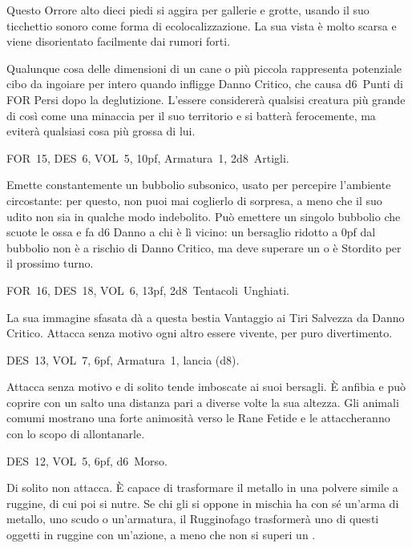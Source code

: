 \documentclass[itdr]{subfiles}
\begin{document}
Questo Orrore alto dieci piedi si aggira per gallerie e grotte, usando il suo ticchettio sonoro come forma di ecolocalizzazione. La sua vista è molto scarsa e viene disorientato facilmente dai rumori forti.

Qualunque cosa delle dimensioni di un cane o più piccola rappresenta potenziale cibo da ingoiare per intero quando infligge Danno Critico, che causa d6~Punti di FOR Persi dopo la deglutizione. L'essere considererà qualsisi creatura più grande di così come una minaccia per il suo territorio e si batterà ferocemente, ma eviterà qualsiasi cosa più grossa di lui.

\break

FOR~15, DES~6, VOL~5, 10pf, Armatura~1, 2d8~Artigli.

Emette constantemente un bubbolio subsonico, usato per percepire l'ambiente circostante: per questo, non puoi mai coglierlo di sorpresa, a meno che il suo udito non sia in qualche modo indebolito.
Può emettere un singolo bubbolio che scuote le ossa e fa d6 Danno a chi è lì vicino: un bersaglio ridotto a 0pf dal bubbolio non è a rischio di Danno Critico, ma deve superare un  o è Stordito per il prossimo turno.

\vfill

FOR~16, DES~18, VOL~6, 13pf, 2d8~Tentacoli~Unghiati.

La sua immagine sfasata dà a questa bestia Vantaggio ai Tiri Salvezza da Danno Critico. Attacca senza motivo ogni altro essere vivente, per puro divertimento.

\vfill

DES~13, VOL~7, 6pf, Armatura~1, lancia (d8).

Attacca senza motivo e di solito tende imboscate ai suoi bersagli. È anfibia e può coprire con un salto una distanza pari a diverse volte la sua altezza. Gli animali comumi mostrano una forte animosità verso le Rane Fetide e le attaccheranno con lo scopo di allontanarle.

\vfill

DES~12, VOL~5, 6pf, d6~Morso.

Di solito non attacca. È capace di trasformare il metallo in una polvere simile a ruggine, di cui poi si nutre. Se chi gli si oppone in mischia ha con sé un'arma di metallo, uno scudo o un'armatura, il Rugginofago trasformerà uno di questi oggetti in ruggine con un'azione, a meno che non si superi un .
\end{document}
